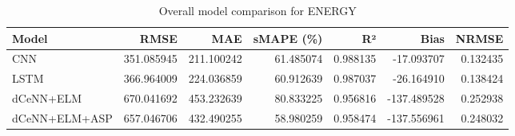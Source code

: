\begin{table}
\caption{Overall model comparison for ENERGY}
\begin{tabular}{lrrrrrr}
\toprule
Model & RMSE & MAE & sMAPE (\%) & R² & Bias & NRMSE \\
\midrule
CNN & 351.085945 & 211.100242 & 61.485074 & 0.988135 & -17.093707 & 0.132435 \\
LSTM & 366.964009 & 224.036859 & 60.912639 & 0.987037 & -26.164910 & 0.138424 \\
dCeNN+ELM & 670.041692 & 453.232639 & 80.833225 & 0.956816 & -137.489528 & 0.252938 \\
dCeNN+ELM+ASP & 657.046706 & 432.490255 & 58.980259 & 0.958474 & -137.556961 & 0.248032 \\
\bottomrule
\end{tabular}
\end{table}
